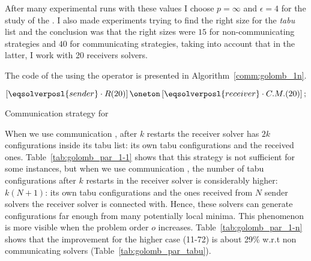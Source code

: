 {After many experimental runs with these values I choose $p = \infty$ and $\epsilon = 4$ for the study of the \commstr. I also made experiments trying to find the right size for the {\it tabu} list and the conclusion was that the right sizes were $15$ for non-communicating strategies and $40$ for communicating strategies, taking into account that in the latter, I work with 20 receivers solvers.
}



The \posl{} code of the \commstr{} using the \oneTn{} operator is presented in Algorithm~\ref{comm:golomb_1n}.

\begin{algorithm}[h]
\dontprintsemicolon
\SetNoline
$\left[\eqsolverposl{sender}\cdot R(20)\right] \oneton \left[\eqsolverposl{receiver}\cdot C.M.(20)\right];$
\caption{Communication strategy \oneTn{} for \GRP}\label{comm:golomb_1n}
\end{algorithm}

When we use communication \oneTone, after $k$ restarts the receiver solver has $2k$ configurations inside its tabu list: its own tabu configurations and the received ones. Table~\ref{tab:golomb_par_1-1} shows that this strategy is not sufficient for some instances, but when we use communication \oneTn, the number of tabu configurations after $k$ restarts in the receiver solver is considerably higher: $k(N+1)$: its own tabu configurations and the ones received from $N$ sender solvers the receiver solver is connected with. Hence, these solvers can generate configurations far enough from many potentially local minima.
This phenomenon is more visible when the problem order $o$ increases. Table~\ref{tab:golomb_par_1-n} shows that the improvement for the higher case (11-72) is about 29\% w.r.t non communicating solvers (Table~\ref{tab:golomb_par_tabu}).

